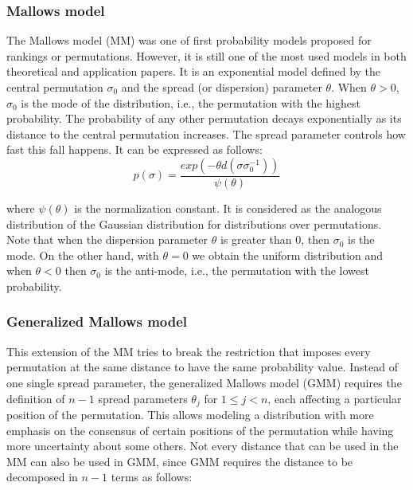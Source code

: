 \documentclass[article,nojss]{jss}
\begin{document}
\subsubsection{Mallows model}%
The Mallows model (MM) was one of first probability models proposed for rankings or permutations. However, it is still one of the most used models in both theoretical and application papers. It is an exponential model defined by the central permutation $\sigma_0$ and the spread (or dispersion) parameter $\theta$. When $\theta>0$, $\sigma_0$ is the mode of the distribution, i.e., the permutation with the highest probability. The probability of any other permutation decays exponentially as its distance to the central permutation increases. The spread parameter controls how fast this fall happens. It can be expressed as follows:
\begin{equation}
p(\sigma) = \frac{exp(-\theta d(\sigma \sigma_0^{-1})) }{\psi(\theta)} 
\nonumber
\end{equation}

\noindent 
where $\psi(\theta)$ is the normalization constant. It is considered as the analogous distribution of the Gaussian distribution for distributions over permutations. Note that when the dispersion parameter $\theta$ is greater than 0, then $\sigma_0$ is the mode. On the other hand, with $\theta = 0$ we obtain the uniform distribution and when $\theta <0$ then $\sigma_0$ is the anti-mode, i.e., the permutation with the lowest probability.
 
\subsubsection{Generalized Mallows model}%
This extension of the MM tries to break the restriction that imposes every permutation at the same distance to have the same probability value. Instead of one single spread parameter, the generalized Mallows model (GMM) requires the definition of $n-1$ spread parameters $\theta_j$ for $1\leq j<n$, each affecting a particular position of the permutation. This allows modeling a distribution with more emphasis on the consensus of certain positions of the permutation while having more uncertainty about some others. Not every distance that can be used in the MM can also be used in GMM, since GMM requires the distance to be decomposed in $n-1$ terms as follows:
\end{document}
